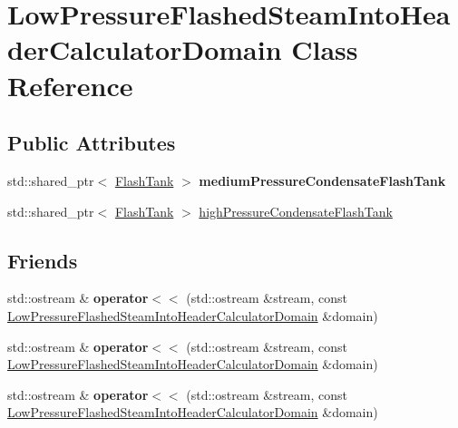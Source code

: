 \hypertarget{class_low_pressure_flashed_steam_into_header_calculator_domain}{}\section{Low\+Pressure\+Flashed\+Steam\+Into\+Header\+Calculator\+Domain Class Reference}
\label{class_low_pressure_flashed_steam_into_header_calculator_domain}
\subsection*{Public Attributes}
\begin{DoxyCompactItemize}
\item 
\mbox{\label{class_low_pressure_flashed_steam_into_header_calculator_domain_a182db50e786afb009ccd5cff6baf085a}} 
std\+::shared\+\_\+ptr$<$ \hyperlink{class_flash_tank}{Flash\+Tank} $>$ {\bfseries medium\+Pressure\+Condensate\+Flash\+Tank}
\item 
std\+::shared\+\_\+ptr$<$ \hyperlink{class_flash_tank}{Flash\+Tank} $>$ \hyperlink{class_low_pressure_flashed_steam_into_header_calculator_domain_a41d5597715b028376dc2c0a880a94e9f}{high\+Pressure\+Condensate\+Flash\+Tank}
\end{DoxyCompactItemize}
\subsection*{Friends}
\begin{DoxyCompactItemize}
\item 
\mbox{\label{class_low_pressure_flashed_steam_into_header_calculator_domain_a2c1e674e9f8c265e86c577a8f96f126b}} 
std\+::ostream \& {\bfseries operator$<$$<$} (std\+::ostream \&stream, const \hyperlink{class_low_pressure_flashed_steam_into_header_calculator_domain}{Low\+Pressure\+Flashed\+Steam\+Into\+Header\+Calculator\+Domain} \&domain)
\item 
\mbox{\label{class_low_pressure_flashed_steam_into_header_calculator_domain_a2c1e674e9f8c265e86c577a8f96f126b}} 
std\+::ostream \& {\bfseries operator$<$$<$} (std\+::ostream \&stream, const \hyperlink{class_low_pressure_flashed_steam_into_header_calculator_domain}{Low\+Pressure\+Flashed\+Steam\+Into\+Header\+Calculator\+Domain} \&domain)
\item 
\mbox{\label{class_low_pressure_flashed_steam_into_header_calculator_domain_a2c1e674e9f8c265e86c577a8f96f126b}} 
std\+::ostream \& {\bfseries operator$<$$<$} (std\+::ostream \&stream, const \hyperlink{class_low_pressure_flashed_steam_into_header_calculator_domain}{Low\+Pressure\+Flashed\+Steam\+Into\+Header\+Calculator\+Domain} \&domain)
\end{DoxyCompactItemize}


